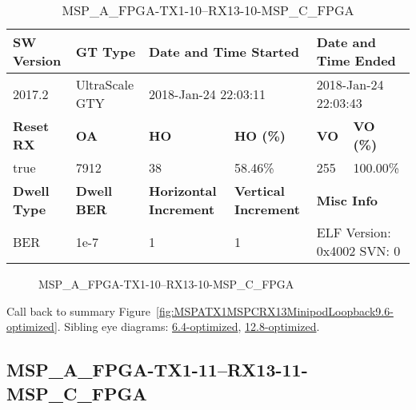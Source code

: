 \begin{table}[h]
\centering
\caption{MSP\_A\_FPGA-TX1-10--RX13-10-MSP\_C\_FPGA}
\label{tab:MSPAFPGATX110RX1310MSPCFPGA9.6-optimized}
\begin{tabular}{@{}|l|l|l|l|l|l|@{}}
\toprule
\textbf{SW Version}                & \textbf{GT Type}   & \multicolumn{2}{l|}{\textbf{Date and Time Started}}            & \multicolumn{2}{l|}{\textbf{Date and Time Ended}}        \\ \midrule
2017.2                       & UltraScale GTY          & \multicolumn{2}{l|}{2018-Jan-24 22:03:11}                   & \multicolumn{2}{l|}{2018-Jan-24 22:03:43}               \\ \midrule
\textbf{Reset RX}                  & \textbf{OA} & \textbf{HO}   & \textbf{HO (\%)} & \textbf{VO} & \textbf{VO (\%)} \\ \midrule
true & 7912        & 38          & 58.46\%        & 255        & 100.00\%       \\ \midrule
\textbf{Dwell Type}                & \textbf{Dwell BER} & \textbf{Horizontal Increment} & \textbf{Vertical Increment}    & \multicolumn{2}{l|}{\textbf{Misc Info}}                  \\ \midrule
BER                            & 1e-7        & 1        & 1           & \multicolumn{2}{l|}{ELF Version: 0x4002 SVN: 0}                         \\ \bottomrule
\end{tabular}
\end{table}

\begin{figure}[h]
\caption{MSP\_A\_FPGA-TX1-10--RX13-10-MSP\_C\_FPGA} \label{fig:MSPAFPGATX110RX1310MSPCFPGA9.6-optimized}
\end{figure}

Call back to summary Figure~\ref{fig:MSPATX1MSPCRX13MinipodLoopback9.6-optimized}.
Sibling eye diagrams: \hyperref[sec:MSPAFPGATX110RX1310MSPCFPGA6.4-optimized]{6.4-optimized}, \hyperref[sec:MSPAFPGATX110RX1310MSPCFPGA12.8-optimized]{12.8-optimized}.

\clearpage
\newpage


\subsection{MSP\_A\_FPGA-TX1-11--RX13-11-MSP\_C\_FPGA}\label{sec:MSPAFPGATX111RX1311MSPCFPGA9.6-optimized}

